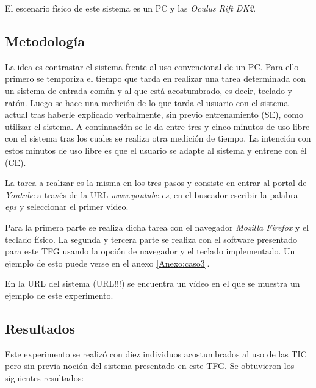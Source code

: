 El escenario f\'isico de este sistema es un PC y las \emph{Oculus Rift DK2}.

\subsection{Metodolog\'ia}
La idea es contrastar el sistema frente al uso convencional de un PC. Para ello primero se temporiza el tiempo que tarda en realizar una tarea determinada con un sistema de entrada com\'un y al que est\'a acostumbrado, es decir, teclado y rat\'on. Luego se hace una medici\'on de lo que tarda el usuario con el sistema actual tras haberle explicado verbalmente, sin previo entrenamiento (SE), como utilizar el sistema. A continuaci\'on se le da entre tres y cinco minutos de uso libre con el sistema tras los cuales se realiza otra medici\'on de tiempo. La intenci\'on con estos minutos de uso libre es que el usuario se adapte al sistema y entrene con \'el (CE).

La tarea a realizar es la misma en los tres pasos y consiste en entrar al portal de \emph{Youtube} a trav\'es de la URL \emph{www.youtube.es}, en el buscador escribir la palabra \emph{eps} y seleccionar el primer video.

Para la primera parte se realiza dicha tarea con el navegador \emph{Mozilla Firefox} y el teclado f\'isico. La segunda y tercera parte se realiza con el software presentado para este TFG usando la opci\'on de navegador y el teclado implementado. Un ejemplo de esto puede verse en el anexo \ref{Anexo:caso3}. 

En la URL del sistema (URL!!!) se encuentra un v\'ideo en el que se muestra un ejemplo de este experimento.

\subsection{Resultados}

Este experimento se realiz\'o con diez individuos acostumbrados al uso de las TIC pero sin previa noci\'on del sistema presentado en este TFG. Se obtuvieron los siguientes resultados:

